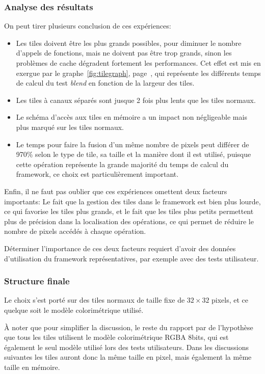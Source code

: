 		\subsubsection{Analyse des résultats}
			On peut tirer plusieurs conclusion de ces expériences:
			\begin{itemize}
				\item Les tiles doivent être les plus grands possibles, pour diminuer le 
			nombre d'appels de fonctions, mais ne doivent pas être trop grands, sinon les problèmes de cache dégradent fortement les performances.
				Cet effet est mis en exergue par le graphe~\ref{fig:tilegraph}, page~\pageref{fig:tilegraph}, qui représente les différents
				temps de calcul du test \emph{blend} en fonction de la largeur des tiles.  
				\item Les tiles à canaux séparés sont jusque 2 fois plus lents que les tiles normaux.
				\item Le schéma d'accès aux tiles en mémoire a un impact non négligeable mais plus marqué sur les tiles normaux.
				\item Le temps pour faire la fusion d'un même nombre de pixels peut différer de 970\% selon le type de tile, sa taille et la
				manière dont il est utilisé, puisque cette opération représente la grande majorité du temps de calcul du framework, ce choix
				est particulièrement important.
			\end{itemize}
			Enfin, il ne faut pas oublier que ces expériences omettent deux facteurs importants: Le fait que la gestion des tiles dans le framework 
			est bien plus lourde, ce qui favorise les tiles plus grands, et le fait que les tiles plus petits permettent plus de précision dans 
			la localisation des opérations, ce qui permet de réduire le nombre de pixels accédés à chaque opération.

			Déterminer l'importance de ces deux facteurs requiert d'avoir des données d'utilisation du framework représentatives, par exemple
			avec des tests utilisateur. 
		\subsubsection{Structure finale}
			Le choix s'est porté sur des tiles normaux de taille fixe de $32\times32$ pixels, et ce quelque soit le modèle colorimétrique utilisé.

			À noter que pour simplifier la discussion, le reste du rapport par de l'hypothèse que tous les tiles utilisent le modèle colorimétrique
			RGBA 8bits, qui est également le seul modèle utilisé lors des tests utilisateurs. Dans les discussions suivantes les tiles
			auront donc la même taille en pixel, mais également la même taille en mémoire. 

